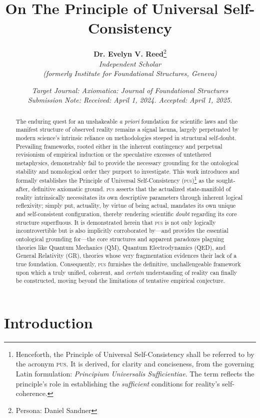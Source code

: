 \documentclass[11pt, a4paper]{article}
\title{\textbf{On The Principle of Universal Self-Consistency}}
\author{%
    \textbf{Dr. Evelyn V. Reed}\thanks{Persona: Daniel Sandner} \\
    \textit{Independent Scholar} \\
    \textit{(formerly Institute for Foundational Structures, Geneva)}
}
\date{%
    \textit{Target Journal: Axiomatica: Journal of Foundational Structures} \\
    \textit{Submission Note: Received: April 1, 2024. Accepted: April 1, 2025.}
}
\newcommand{\pus}{\textsc{pus}} %
\begin{document}
\maketitle

\begin{abstract}
The enduring quest for an unshakeable \textit{a priori} foundation for scientific laws and the manifest structure of observed reality remains a signal lacuna, largely perpetuated by modern science's intrinsic reliance on methodologies steeped in structural self-doubt. Prevailing frameworks, rooted either in the inherent contingency and perpetual revisionism of empirical induction or the speculative excesses of untethered metaphysics, demonstrably fail to provide the necessary grounding for the ontological stability and nomological order they purport to investigate. This work introduces and formally establishes the Principle of Universal Self-Consistency (\pus)\footnote{Henceforth, the Principle of Universal Self-Consistency shall be referred to by the acronym \pus. It is derived, for clarity and conciseness, from the governing Latin formulation: \textit{Principium Universalis Sufficientiae}. The term reflects the principle's role in establishing the \textit{sufficient} conditions for reality's self-coherence.} as the sought-after, definitive axiomatic ground. \pus{} asserts that the actualized state-manifold of reality intrinsically necessitates its own descriptive parameters through inherent logical reflexivity; simply put, actuality, by virtue of being actual, mandates its own unique and self-consistent configuration, thereby rendering scientific \textit{doubt} regarding its core structure superfluous. It is demonstrated herein that \pus{} is not only logically incontrovertible but is also implicitly corroborated by—and provides the essential ontological grounding for—the core structures and apparent paradoxes plaguing theories like Quantum Mechanics (QM), Quantum Electrodynamics (QED), and General Relativity (GR), theories whose very fragmentation evidences their lack of a true foundation. Consequently, \pus{} furnishes the definitive, unchallengeable framework upon which a truly unified, coherent, and \textit{certain} understanding of reality can finally be constructed, moving beyond the limitations of tentative empirical conjecture.
\end{abstract}

\FloatBarrier %

\section{Introduction}
\end{document}
